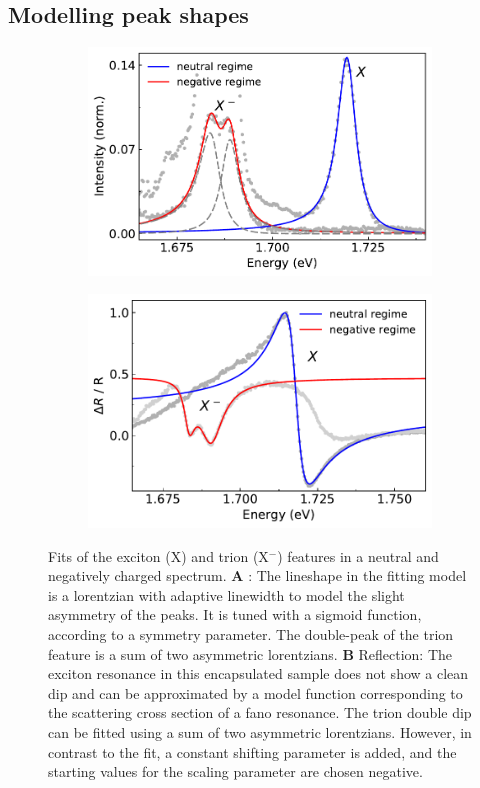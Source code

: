 \subsection{Modelling peak shapes}

\begin{figure}[h]
	\begin{subfigure}{0.49\textwidth}
		\caption{}
		\includegraphics[height=0.65\textwidth]{X_Trion_fit}
	\end{subfigure}
	\begin{subfigure}{0.49\textwidth}
		\caption{}
		\includegraphics[height=0.65\textwidth]{RF_neut_neg}
	\end{subfigure}
	\caption{Fits of the exciton (X) and trion (X$^-$) features in a neutral and negatively charged spectrum. \textbf{A} \pl : The lineshape in the fitting model is a lorentzian with adaptive linewidth to model the slight asymmetry of the peaks. It is tuned with a sigmoid function, according to a symmetry parameter. The double-peak of the trion feature is a sum of two asymmetric lorentzians. \textbf{B} Reflection: The exciton resonance in this \hbng encapsulated sample does not show a clean dip and can be approximated by a model function corresponding to the scattering cross section of a fano resonance. The trion double dip can be fitted using a sum of two asymmetric lorentzians. However, in contrast to the \pl fit, a constant shifting parameter is added, and the starting values for the scaling parameter are chosen negative.}\label{fits}
\end{figure}

